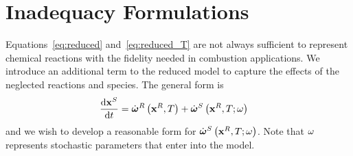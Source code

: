 \section{Inadequacy Formulations}
Equations~\eqref{eq:reduced} and~\eqref{eq:reduced_T} are not always sufficient to represent 
chemical reactions with the fidelity needed in combustion applications.  We introduce an 
additional term to the reduced model to capture the effects of the neglected reactions and 
species.  The general form is 
\begin{align}
  \frac{\mathrm{d} \mathbf{x}^{S}}{\mathrm{d} t} &= \dot{\boldsymbol{\omega}}^{R}\left(\mathbf{x}^{R}, T\right) + \dot{\boldsymbol{\omega}}^{S}\left(\mathbf{x}^{R}, T; \omega\right)
\end{align}
and we wish to develop a reasonable form for $\dot{\boldsymbol{\omega}}^{S}\left(\mathbf{x}^{R}, T; \omega\right)$.  Note that $\omega$ 
represents stochastic parameters that enter into the model.

%
%
%

